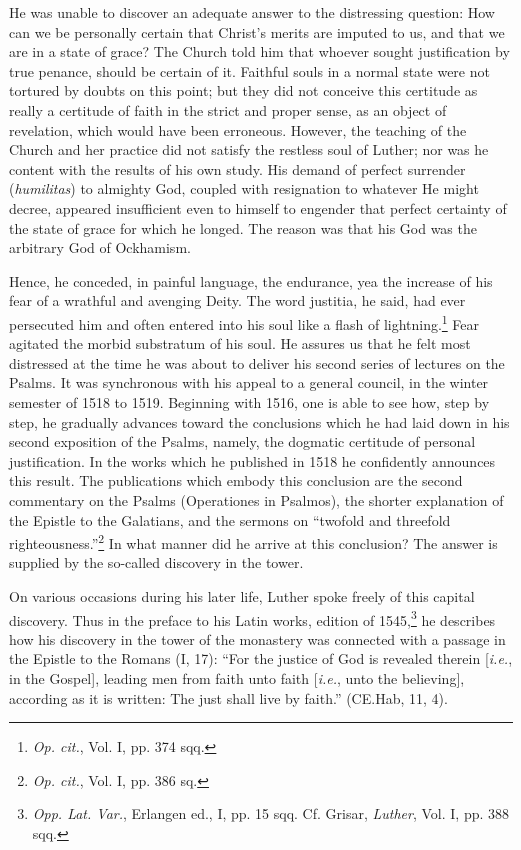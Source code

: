 He was unable to discover an adequate answer to the distressing
question: How can we be personally certain that Christ’s merits are
imputed to us, and that we are in a state of grace? The Church told
him that whoever sought justification by true penance, should be
certain of it. Faithful souls in a normal state were not tortured by
doubts on this point; but they did not conceive this certitude as
really a certitude of faith in the strict and proper sense, as an
object of revelation, which would have been erroneous. However,
the teaching of the Church and her practice did not satisfy the restless
soul of Luther; nor was he content with the results of his own
study. His demand of perfect surrender (\textit{humilitas}) to almighty
God, coupled with resignation to whatever He might decree, appeared insufficient
even to himself to engender that perfect certainty
of the state of grace for which he longed. The reason was that his
God was the arbitrary God of Ockhamism.

Hence, he conceded, in painful language, the endurance, yea the
increase of his fear of a wrathful and avenging Deity. The word
justitia, he said, had ever persecuted him and often entered into his
soul like a flash of lightning.\footnote{\textit{Op. cit.}, Vol. I, pp. 374 sqq.}
Fear agitated the morbid substratum
of his soul. He assures us that he felt most distressed at the time he
was about to deliver his second series of lectures on the Psalms. It
was synchronous with his appeal to a general council, in the winter
semester of 1518 to 1519. Beginning with 1516, one is able to see
how, step by step, he gradually advances toward the conclusions
which he had laid down in his second exposition of the Psalms,
namely, the dogmatic certitude of personal justification. In the
works which he published in 1518 he confidently announces this
result. The publications which embody this conclusion are the second
commentary on the Psalms (Operationes in Psalmos), the shorter
explanation of the Epistle to the Galatians, and the sermons on “twofold
and threefold righteousness.”\footnote{\textit{Op. cit.}, Vol. I, pp. 386 sq.}
In what manner did he arrive
at this conclusion? The answer is supplied by the so-called discovery
in the tower.

On various occasions during his later life, Luther spoke freely
of this capital discovery. Thus in the preface to his Latin works,
edition of 1545,\footnote
{\textit{Opp. Lat. Var.}, Erlangen ed., I, pp. 15 sqq. Cf. Grisar, \textit{Luther}, Vol. I, pp. 388 sqq.}
he describes how his discovery in the tower of the
monastery was connected with a passage in the Epistle to the Romans
(I, 17): “For the justice of God is revealed therein [\textit{i.e.}, in the
Gospel], leading men from faith unto faith [\textit{i.e.}, unto the believing],
according as it is written: The just shall live by faith.” (CE.Hab, 11, 4).

